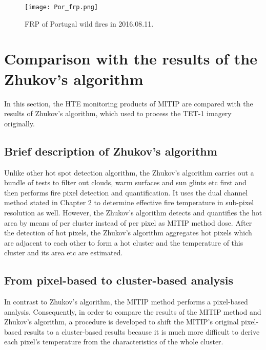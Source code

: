 \begin{figure}[!htbp]
\centering
\texttt{[image: Por\_frp.png]}
\caption{FRP of Portugal wild fires in 2016.08.11.}
\label{fig:Por_frp}
\end{figure}


\section{Comparison with the results of the Zhukov's algorithm}
In this section, the HTE monitoring products of MITIP are compared with the results of Zhukov's algorithm, which used to process the TET-1 imagery originally.\\


\subsection{Brief description of Zhukov's algorithm}
Unlike other hot spot detection algorithm, the Zhukov's algorithm carries out a bundle of tests to filter out clouds, warm surfaces and sun glints etc first and then performs fire pixel detection and quantification. It uses the dual channel method stated in Chapter 2 to determine effective fire temperature in sub-pixel resolution as well. However, the Zhukov's algorithm detects and quantifies the hot area by means of per cluster instead of per pixel as MITIP method dose. After the detection of hot pixels, the Zhukov's algorithm aggregates hot pixels which are adjacent to each other to form a hot cluster and the temperature of this cluster and its area etc are estimated.\\


\subsection{From pixel-based to cluster-based analysis}
In contrast to Zhukov's algorithm, the MITIP method performs a pixel-based analysis. Consequently, in order to compare the results of the MITIP method and Zhukov's algorithm, a procedure is developed to shift the MITIP's original pixel-based results to a cluster-based results because it is much more difficult to derive each pixel's temperature from the characteristics of the whole cluster. \\


